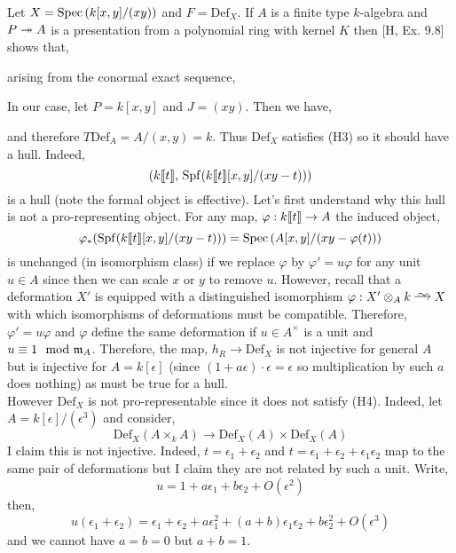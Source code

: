 \documentclass[12pt]{article}
\newcommand{\Def}{\mathrm{Def}}
\newcommand{\Spf}[1]{\mathrm{Spf} \! \left(#1 \right)}
\begin{document}
\begin{example}
Let $X = \mathrm{Spec}\left( k[x,y]/(xy) \right)$ and $F = \Def_X$. If $A$ is a finite type $k$-algebra and $P \twoheadrightarrow A$ is a presentation from a polynomial ring with kernel $K$ then [H, Ex. 9.8] shows that,
\begin{center}
\end{center}
arising from the conormal exact sequence,
\begin{center}
\end{center}
In our case, let $P = k[x,y]$ and $J = (xy)$. Then we have,
\begin{center}
\end{center}
and therefore $T \Def_A = A/(x,y) = k$. Thus $\Def_X$ satisfies (H3) so it should have a hull. Indeed,
\[ (k\dbrac{t}, \, \Spf{k\dbrac{t}[x,y]/(xy - t)}) \]
is a hull (note the formal object is effective). Let's first understand why this hull is not a pro-representing object. For any map, $\varphi : k\llbracket t \rrbracket \to A$ the induced object,
\[ \varphi_*(\Spf{k\dbrac{t}[x,y]/(xy - t)}) = \Spec{A[x,y]/(xy - \varphi(t))} \]
is unchanged (in isomorphism class) if we replace $\varphi$ by $\varphi' = u \varphi$ for any unit $u \in A$ since then we can scale $x$ or $y$ to remove $u$. However, recall that a deformation $X'$ is equipped with a distinguished isomorphism $\varphi : X' \ot_A k \iso X$ with which isomorphisms of deformations must be compatible. Therefore, $\varphi' = u \varphi$ and $\varphi$ define the same deformation if $u \in A^\times$ is a unit and $u \equiv 1 \mod {\mathfrak{m}}_A$. Therefore, the map, $h_R \to \Def_X$ is not injective for general $A$ but is injective for $A = k[\epsilon]$ (since $(1 +  a \epsilon) \cdot \epsilon = \epsilon$ so multiplication by such $a$ does nothing) as must be true for a hull.  
\bigskip\\
However $\Def_X$ is not pro-representable since it does not satisfy (H4). Indeed, let $A = k[\epsilon]/(\epsilon^3)$ and consider,
\[ \Def_X(A \times_k A) \to \Def_X(A) \times \Def_X(A) \]
I claim this is not injective. Indeed, $t = \epsilon_1 + \epsilon_2$ and $t = \epsilon_1 + \epsilon_2 + \epsilon_1 \epsilon_2$ map to the same pair of deformations but I claim they are not related by such a unit. Write,
\[ u = 1 + a \epsilon_1 + b \epsilon_2 + O(\epsilon^2) \]
then,
\[ u (\epsilon_1 + \epsilon_2) = \epsilon_1 + \epsilon_2 + a \epsilon_1^2 + (a + b) \epsilon_1 \epsilon_2 + b \epsilon_2^2 + O(\epsilon^3) \] 
and we cannot have $a = b = 0$ but $a + b = 1$.
\end{example}
\end{document}
